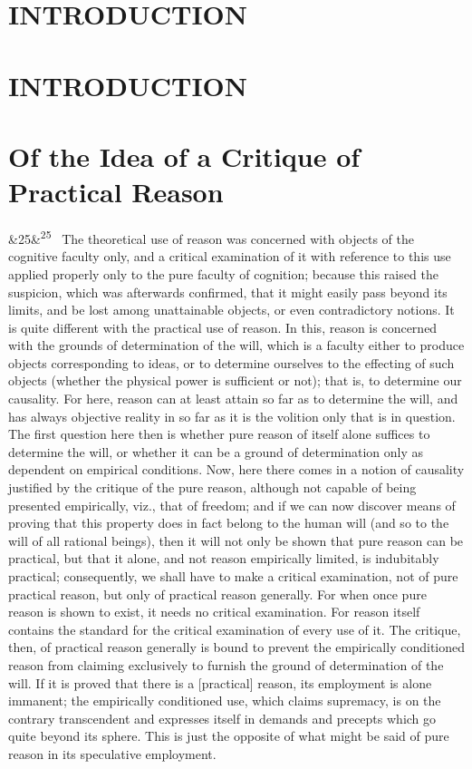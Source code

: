 \documentclass[12pt]{article}
\newcommand{\para}[1][]{\par\noindent\ifx&#1&\else\textsuperscript{\footnotesize #1}~\fi}
\begin{document}
\section*{INTRODUCTION}

\section*{INTRODUCTION}

\section*{Of the Idea of a Critique of Practical Reason}

\para[25] The theoretical use of reason was concerned with objects of the cognitive faculty only, and a critical examination of it with reference to this use applied properly only to the pure faculty of cognition; because this raised the suspicion, which was afterwards confirmed, that it might easily pass beyond its limits, and be lost among unattainable objects, or even contradictory notions. It is quite different with the practical use of reason. In this, reason is concerned with the grounds of determination of the will, which is a faculty either to produce objects corresponding to ideas, or to determine ourselves to the effecting of such objects (whether the physical power is sufficient or not); that is, to determine our causality. For here, reason can at least attain so far as to determine the will, and has always objective reality in so far as it is the volition only that is in question. The first question here then is whether pure reason of itself alone suffices to determine the will, or whether it can be a ground of determination only as dependent on empirical conditions. Now, here there comes in a notion of causality justified by the critique of the pure reason, although not capable of being presented empirically, viz., that of freedom; and if we can now discover means of proving that this property does in fact belong to the human will (and so to the will of all rational beings), then it will not only be shown that pure reason can be practical, but that it alone, and not reason empirically limited, is indubitably practical; consequently, we shall have to make a critical examination, not of pure practical reason, but only of practical reason generally. For when once pure reason is shown to exist, it needs no critical examination. For reason itself contains the standard for the critical examination of every use of it. The critique, then, of practical reason generally is bound to prevent the empirically conditioned reason from claiming exclusively to furnish the ground of determination of the will. If it is proved that there is a [practical] reason, its employment is alone immanent; the empirically conditioned use, which claims supremacy, is on the contrary transcendent and expresses itself in demands and precepts which go quite beyond its sphere. This is just the opposite of what might be said of pure reason in its speculative employment.
\end{document}
